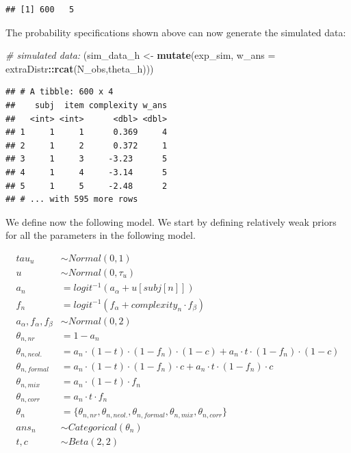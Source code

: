 \documentclass[12pt,]{krantz}
\newenvironment{Shaded}{\begin{snugshade}}{\end{snugshade}}
\newcommand{\CommentTok}[1]{\textcolor[rgb]{0.56,0.35,0.01}{\textit{#1}}}
\newcommand{\DataTypeTok}[1]{\textcolor[rgb]{0.13,0.29,0.53}{#1}}
\newcommand{\KeywordTok}[1]{\textcolor[rgb]{0.13,0.29,0.53}{\textbf{#1}}}
\newcommand{\NormalTok}[1]{#1}
\newcommand{\OperatorTok}[1]{\textcolor[rgb]{0.81,0.36,0.00}{\textbf{#1}}}
\newcommand{\StringTok}[1]{\textcolor[rgb]{0.31,0.60,0.02}{#1}}
\theoremstyle{definition}
\theoremstyle{definition}
\theoremstyle{definition}
\theoremstyle{remark}
\begin{document}
\begin{verbatim}
## [1] 600   5
\end{verbatim}

The probability specifications shown above can now generate the simulated data:

\begin{Shaded}
\begin{Highlighting}[]
\CommentTok{# simulated data:}
\NormalTok{(sim_data_h <-}\StringTok{ }\KeywordTok{mutate}\NormalTok{(exp_sim,}
                      \DataTypeTok{w_ans =}\NormalTok{ extraDistr}\OperatorTok{::}\KeywordTok{rcat}\NormalTok{(N_obs,theta_h)))}
\end{Highlighting}
\end{Shaded}

\begin{verbatim}
## # A tibble: 600 x 4
##    subj  item complexity w_ans
##   <int> <int>      <dbl> <dbl>
## 1     1     1      0.369     4
## 2     1     2      0.372     1
## 3     1     3     -3.23      5
## 4     1     4     -3.14      5
## 5     1     5     -2.48      2
## # ... with 595 more rows
\end{verbatim}

We define now the following model. We start by defining relatively weak priors for all the parameters in the following model.

\begin{equation}
\begin{aligned}
tau_u &\sim Normal(0, 1)\\
u &\sim Normal(0, \tau_u)\\
a_n &= logit^{-1}(a_\alpha + u[subj[n]])\\
f_n &= logit^{-1}(f_\alpha + complexity_n \cdot f_\beta)\\
a_\alpha, f_\alpha, f_\beta &\sim Normal(0, 2)\\
\theta_{n,nr} &= 1 - a_n \\
\theta_{n,neol.} &= a_n \cdot (1-t) \cdot (1-f_n) \cdot (1-c) +  a_n \cdot t \cdot (1-f_n) \cdot (1-c)\\
\theta_{n,formal} &= a_n \cdot (1-t) \cdot (1-f_n) \cdot c +  a_n \cdot t \cdot (1-f_n) \cdot c\\
\theta_{n,mix} &= a_n \cdot (1-t) \cdot f_n\\
\theta_{n,corr} &= a_n \cdot t \cdot f_n\\
\theta_n &= \{\theta_{n, nr}, \theta_{n, neol.}, \theta_{n, formal}, \theta_{n, mix}, \theta_{n, corr}\}\\
ans_n &\sim Categorical(\theta_n)\\
t,c &\sim Beta(2, 2)
\end{aligned}
\end{equation}
\end{document}
